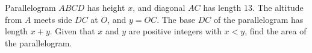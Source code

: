 Parallelogram $ABCD$ has height $x$, and diagonal $AC$ has length $13$. The altitude from $A$ meets side $DC$ at $O$, and $y=OC$. The base $DC$ of the parallelogram has length $x+y$. Given that $x$ and $y$ are positive integers with $x<y$, find the area of the parallelogram.
